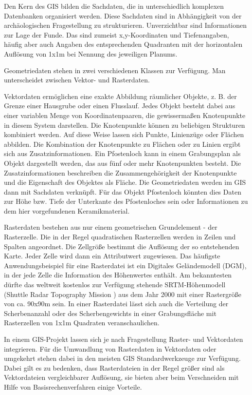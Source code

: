 Den Kern des GIS bilden die Sachdaten, die in unterschiedlich komplexen Datenbanken organisiert werden. Diese Sachdaten sind in Abhängigkeit von der archäologischen Fragestellung zu strukturieren. Unverzichtbar sind Informationen zur Lage der Funde. Das sind zumeist x,y-Koordinaten und Tiefenangaben, häufig aber auch Angaben des entsprechenden Quadranten mit der horizontalen Auflösung von 1x1m bei Nennung des jeweiligen Planums.

Geometriedaten stehen in zwei verschiedenen Klassen zur Verfügung. Man unterscheidet zwischen Vektor- und Rasterdaten. 

Vektordaten ermöglichen eine exakte Abbildung räumlicher Objekte, z. B. der Grenze einer Hausgrube oder einen Flusslauf. Jedes Objekt besteht dabei aus einer variablen Menge von Koordinatenpaaren, die gewissermaßen Knotenpunkte in diesem System darstellen. Die Knotenpunkte können zu beliebigen Strukturen kombiniert werden. Auf diese Weise lassen sich Punkte, Linienzüge oder Flächen abbilden. Die Kombination der Knotenpunkte zu Flächen oder zu Linien ergibt sich aus Zusatzinformationen. Ein Pfostenloch kann in einem Grabungsplan als Objekt dargestellt werden, das aus fünf oder mehr Knotenpunkten besteht. Die Zusatzinformationen beschreiben die Zusammengehörigkeit der Knotenpunkte und die Eigenschaft des Objektes als Fläche. Die Geometriedaten werden im GIS dann mit Sachdaten verknüpft. Für das Objekt Pfostenloch könnten dies Daten zur Höhe bzw. Tiefe der Unterkante des Pfostenloches sein oder Informationen zu dem hier vorgefundenen Keramikmaterial. 

Rasterdaten bestehen aus nur einem geometrischen Grundelement - der Rasterzelle. Die in der Regel quadratischen Rasterzellen werden in Zeilen und Spalten angeordnet. Die Zellgröße bestimmt die Auflösung der so entstehenden Karte. Jeder Zelle wird dann ein Attributwert zugewiesen. Das häufigste Anwendungsbeispiel für eine Rasterdatei ist ein Digitales Geländemodell (DGM), in der jede Zelle die Information des Höhenwertes enthält. Am bekanntesten dürfte das weltweit kostenlos zur Verfügung stehende SRTM-Höhenmodell (Shuttle Radar Topography Mission  )  aus dem Jahr 2000 mit einer Rastergröße von ca. 90x90m sein. In einer Rasterdatei lässt sich auch die Verteilung der Scherbenanzahl oder des Scherbengewichts in einer Grabungsfläche mit Rasterzellen von 1x1m Quadraten veranschaulichen. 

In einem GIS-Projekt lassen sich je nach Fragestellung Raster- und Vektordaten integrieren. Für die Umwandlung von Rasterdaten in Vektordaten oder umgekehrt stehen dabei in den meisten GIS Standardwerkzeuge zur Verfügung. Dabei gilt es zu bedenken, dass Rasterdateien in der Regel größer sind als  Vektordateien vergleichbarer Auflösung, sie bieten aber beim Verschneiden mit Hilfe von Basisrechenverfahren einige Vorteile. 

